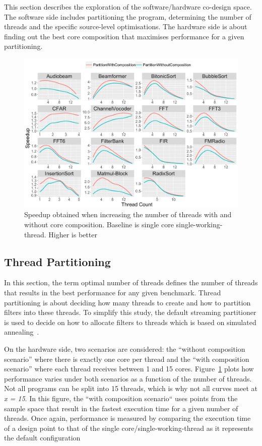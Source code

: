 This section describes the exploration of the software/hardware co-design space.
The software side includes partitioning the program, determining the number of threads and the specific source-level optimisations.
The hardware side is about finding out the best core composition that maximises performance for a given partitioning.

\begin{figure}[t]
 \centering
    \includegraphics[width=1\textwidth]{streamit-paper/graphics/threadingmaybe6.pdf}
    \caption{Speedup obtained when increasing the number of threads with and without core composition. Baseline is single core single-working-thread. Higher is better}\label{fig:threadtrend}  \vspace{-1em}

\end{figure}

\subsection{Thread Partitioning}

In this section, the term optimal number of threads defines the number of threads that results in the best performance for any given benchmark.
Thread partitioning is about deciding how many threads to create and how to partition filters into these threads.
To simplify this study, the default streaming partitioner is used to decide on how to allocate filters to threads which is based on simulated annealing~\cite{simulatedAnnealing1983}.

On the hardware side, two scenarios are considered: the ``without composition scenario'' where there is exactly one core per thread and the ``with composition scenario'' where each thread receives between 1 and 15 cores.
Figure~\ref{fig:threadtrend} plots how performance varies under both scenarios as a function of the number of threads.
Not all programs can be split into 15 threads, which is why not all curves meet at \textit{x = 15}.
In this figure, the ``with composition scenario`` uses points from the sample space that result in the fastest execution time for a given number of threads.
Once again, performance is measured by comparing the execution time of a design point to that of the single core/single-working-thread as it represents the default configuration

